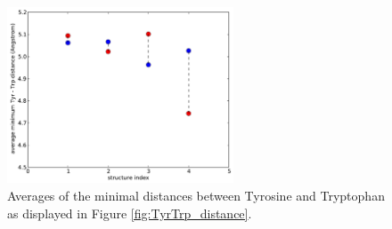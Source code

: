 \documentclass[english, a4paper, 12pt, titlepage, draft]{article}
\begin{document}
\begin{figure}
    \centering
    \includegraphics[width=0.6\textwidth]{figures/TyrTrp/average_mindist_TyrTrp.pdf}
    \caption{Averages of the minimal distances between Tyrosine and Tryptophan as displayed in Figure \ref{fig:TyrTrp_distance}.}
    \label{fig:TyrTrp_average}
\end{figure}         



          
\end{document}
